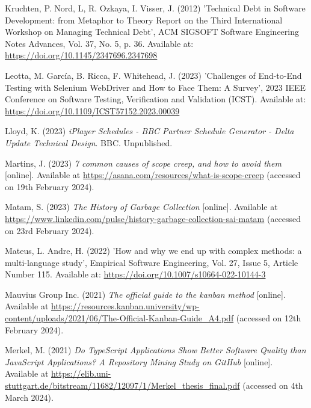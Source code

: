 \noindent Kruchten, P. Nord, L, R. Ozkaya, I. Visser, J. (2012) 'Technical Debt in Software Development: from Metaphor to Theory Report on the Third International Workshop on Managing Technical Debt', ACM SIGSOFT Software Engineering Notes Advances, Vol. 37, No. 5, p. 36. Available at: \url{https://doi.org/10.1145/2347696.2347698}
\vspace{0.2cm}

\noindent Leotta, M. García, B. Ricca, F. Whitehead, J. (2023) 'Challenges of End-to-End Testing with Selenium WebDriver and How to Face Them: A Survey', 2023 IEEE Conference on Software Testing, Verification and Validation (ICST). Available at: \url{https://doi.org/10.1109/ICST57152.2023.00039}
\vspace{0.2cm}

\noindent Lloyd, K. (2023) \textit{iPlayer Schedules - BBC Partner Schedule Generator - Delta Update Technical Design}. BBC. Unpublished.
\vspace{0.2cm}

\noindent Martins, J. (2023) \textit{7 common causes of scope creep, and how to avoid them} [online]. Available at \url{https://asana.com/resources/what-is-scope-creep} (accessed on 19th February 2024).
\vspace{0.2cm}

\noindent Matam, S. (2023) \textit{The History of Garbage Collection} [online]. Available at \url{https://www.linkedin.com/pulse/history-garbage-collection-sai-matam} (accessed on 23rd February 2024).
\vspace{0.2cm}

\noindent Mateus, L. Andre, H. (2022) 'How and why we end up with complex methods: a multi-language study', Empirical Software Engineering, Vol. 27, Issue 5, Article Number 115. Available at: \url{https://doi.org/10.1007/s10664-022-10144-3}
\vspace{0.2cm}

\noindent Mauvius Group Inc. (2021) \textit{The official guide to the kanban method} [online]. Available at \url{https://resources.kanban.university/wp-content/uploads/2021/06/The-Official-Kanban-Guide_A4.pdf} (accessed on 12th February 2024).
\vspace{0.2cm}

\noindent Merkel, M. (2021) \textit{Do TypeScript Applications Show Better Software Quality than JavaScript Applications? A Repository Mining Study on GitHub} [online]. Available at \url{https://elib.uni-stuttgart.de/bitstream/11682/12097/1/Merkel_thesis_final.pdf} (accessed on 4th March 2024).
\vspace{0.2cm}

